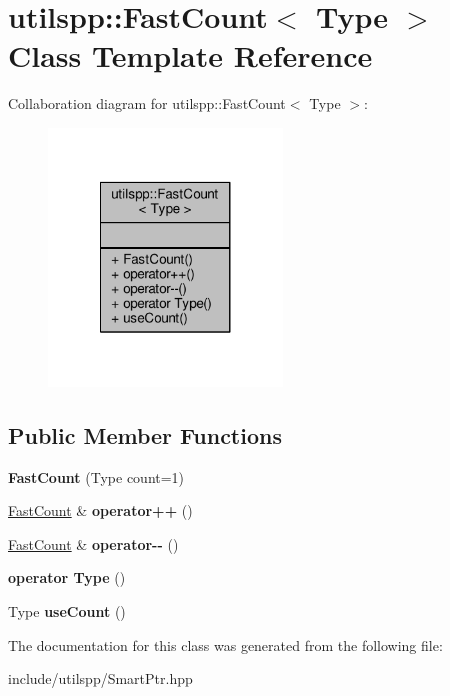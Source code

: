 \hypertarget{classutilspp_1_1FastCount}{\section{utilspp\-:\-:Fast\-Count$<$ Type $>$ Class Template Reference}
\label{classutilspp_1_1FastCount}
}


Collaboration diagram for utilspp\-:\-:Fast\-Count$<$ Type $>$\-:\nopagebreak
\begin{figure}[H]
\begin{center}
\leavevmode
\includegraphics[width=176pt]{classutilspp_1_1FastCount__coll__graph}
\end{center}
\end{figure}
\subsection*{Public Member Functions}
\begin{DoxyCompactItemize}
\item 
\hypertarget{classutilspp_1_1FastCount_aef266176c977bb05093a5a76ff0ccee0}{{\bfseries Fast\-Count} (Type count=1)}\label{classutilspp_1_1FastCount_aef266176c977bb05093a5a76ff0ccee0}

\item 
\hypertarget{classutilspp_1_1FastCount_acbd72fe50f973ddd1c218c5266af218b}{\hyperlink{classutilspp_1_1FastCount}{Fast\-Count} \& {\bfseries operator++} ()}\label{classutilspp_1_1FastCount_acbd72fe50f973ddd1c218c5266af218b}

\item 
\hypertarget{classutilspp_1_1FastCount_ac4dbd8095fc6b8c82f3397199a180dbf}{\hyperlink{classutilspp_1_1FastCount}{Fast\-Count} \& {\bfseries operator-\/-\/} ()}\label{classutilspp_1_1FastCount_ac4dbd8095fc6b8c82f3397199a180dbf}

\item 
\hypertarget{classutilspp_1_1FastCount_aeed9ce68983113d1e74e64c17a4a9705}{{\bfseries operator Type} ()}\label{classutilspp_1_1FastCount_aeed9ce68983113d1e74e64c17a4a9705}

\item 
\hypertarget{classutilspp_1_1FastCount_a0dcf8ab9597e5b96944a0f3db1b7c1ce}{Type {\bfseries use\-Count} ()}\label{classutilspp_1_1FastCount_a0dcf8ab9597e5b96944a0f3db1b7c1ce}

\end{DoxyCompactItemize}


The documentation for this class was generated from the following file\-:\begin{DoxyCompactItemize}
\item 
include/utilspp/Smart\-Ptr.\-hpp\end{DoxyCompactItemize}

